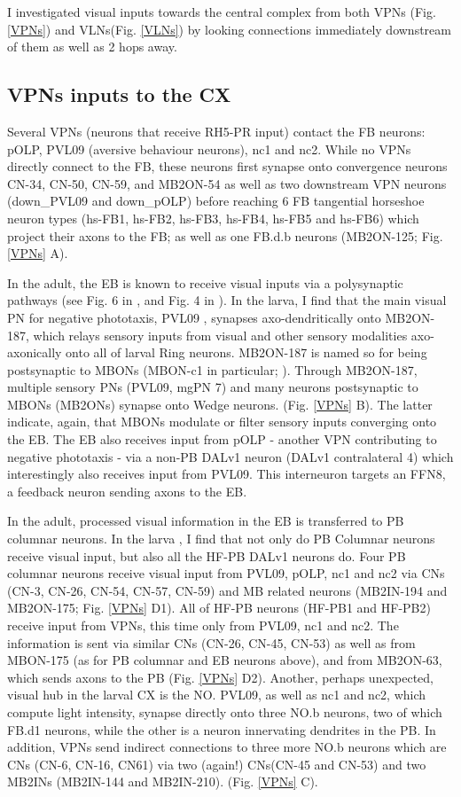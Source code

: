     I investigated visual inputs towards the central complex from both VPNs (Fig. \ref{VPNs}) and VLNs(Fig. \ref{VLNs}) by looking connections immediately downstream of them as well as 2 hops away.

    \subsection{VPNs inputs to the CX}
    Several VPNs (neurons that receive RH5-PR input) contact the FB neurons: pOLP, PVL09 (aversive behaviour neurons), nc1 and nc2. While no VPNs directly connect to the FB, these neurons first synapse onto convergence neurons CN-34, CN-50, CN-59,  and MB2ON-54 as well as two downstream VPN neurons (down\_PVL09 and down\_pOLP) before reaching 6 FB tangential horseshoe neuron types (hs-FB1, hs-FB2, hs-FB3, hs-FB4, hs-FB5 and hs-FB6) which project their axons to the FB; as well as one FB.d.b neurons (MB2ON-125; Fig. \ref{VPNs} A).

    In the adult, the EB is known to receive visual inputs via a polysynaptic pathways (see Fig. 6 in \citep{hulse2021connectome}, and Fig. 4 in \citep{omoto2018neuronal}). In the larva, I find that the main visual PN for negative phototaxis, PVL09  \citep{Humberg2018PVL09}, synapses axo-dendritically onto MB2ON-187, which relays sensory inputs from visual and other sensory modalities axo-axonically onto all of larval Ring neurons.  MB2ON-187 is named so for being postsynaptic to MBONs (MBON-c1 in particular; \citep{eschbach2021circuits}). Through MB2ON-187, multiple sensory PNs (PVL09, mgPN 7) and many neurons postsynaptic to MBONs (MB2ONs) synapse onto Wedge neurons. (Fig. \ref{VPNs} B).
    The latter indicate, again, that MBONs modulate or filter sensory inputs converging onto the EB. The EB also receives input from pOLP - another VPN contributing to negative phototaxis - via a non-PB DALv1 neuron (DALv1 contralateral 4) which interestingly also receives input from PVL09.  This interneuron targets an FFN8, a feedback neuron sending axons to the EB. 

    In the adult,  processed visual information in the EB is transferred to PB columnar neurons. In the larva , I find that not only do PB Columnar neurons receive visual input, but also all the HF-PB DALv1 neurons do.  Four PB columnar neurons receive visual input from PVL09,  pOLP, nc1 and nc2 via CNs (CN-3, CN-26, CN-54, CN-57, CN-59) and MB related neurons (MB2IN-194 and MB2ON-175; Fig. \ref{VPNs} D1).  
    All of HF-PB neurons (HF-PB1 and HF-PB2) receive input from VPNs, this time only from PVL09, nc1 and nc2. The information is sent via similar CNs (CN-26, CN-45, CN-53) as well as from MBON-175 (as for PB columnar and EB neurons above), and from MB2ON-63, which sends axons to the PB (Fig. \ref{VPNs} D2).  
    Another, perhaps unexpected, visual hub in the larval CX is the NO. PVL09, as well as nc1 and nc2, which compute light intensity, synapse directly onto three NO.b neurons, two of which FB.d1 neurons, while the other is a neuron innervating dendrites in the PB. In addition, VPNs send indirect connections to three more NO.b neurons which are CNs (CN-6, CN-16, CN61) via two (again!) CNs(CN-45 and CN-53) and two MB2INs (MB2IN-144 and MB2IN-210). (Fig. \ref{VPNs} C).

